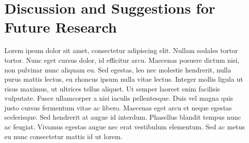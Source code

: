 \chapter{Discussion and Suggestions for Future Research}

Lorem ipsum dolor sit amet, consectetur adipiscing elit. Nullam sodales tortor tortor. Nunc eget cursus dolor, id efficitur arcu. Maecenas posuere dictum nisi, non pulvinar nunc aliquam eu. Sed egestas, leo nec molestie hendrerit, nulla purus mattis lectus, eu rhoncus ipsum nulla vitae lectus. Integer mollis ligula ut risus maximus, ut ultrices tellus aliquet. Ut semper laoreet enim facilisis vulputate. Fusce ullamcorper a nisi iaculis pellentesque. Duis vel magna quis justo cursus fermentum vitae ac libero. Maecenas eget arcu et neque egestas scelerisque. Sed hendrerit at augue id interdum. Phasellus blandit tempus nunc ac feugiat. Vivamus egestas augue nec erat vestibulum elementum. Sed ac metus eu nunc consectetur mattis id ut lorem.